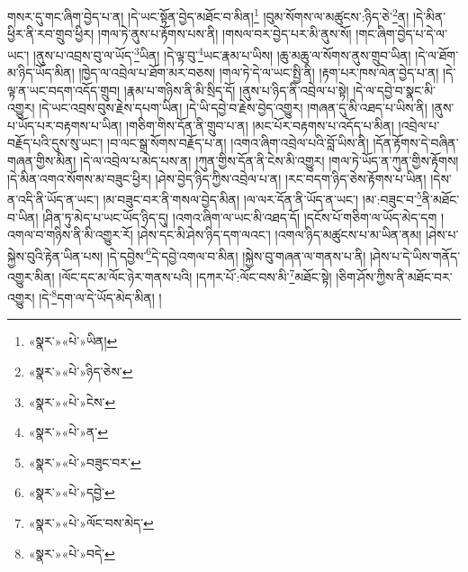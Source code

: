 གསར་དུ་གང་ཞིག་བྱེད་པ་ན། །དེ་ཡང་སྟོན་བྱེད་མཐོང་བ་མིན།\footnote{«སྣར་»«པེ་»ཡིན།} །བུམ་སོགས་ལ་མཚུངས་:ཉིད་ཅེ་\footnote{«སྣར་»«པེ་»ཉིད་ཅེས་}ན། །དེ་མིན་ཕྱིར་ནི་རབ་གྲུབ་ཕྱིར། །གལ་ཏེ་ནུས་པ་རྟོགས་པས་ནི། །གསལ་བར་བྱེད་པར་མི་ནུས་སོ། །གང་ཞིག་བྱེད་པ་དེ་ལ་ཡང་། །ནུས་པ་འབྲས་བུ་ལ་ཡོད་\footnote{«སྣར་»«པེ་»ངེས་}ཡིན། །དེ་ལྟ་བུ་\footnote{«སྣར་»«པེ་»ན་}ཡང་རྣམ་པ་ཡིས། །ཆུ་མཆུ་ལ་སོགས་ནུས་གྲུབ་ཡིན། །དེ་ལ་ཐོག་མ་ཉིད་ཡོད་མིན། །ཁྱེད་ལ་འབྲེལ་པ་ཐོག་མར་བཅས། །གལ་ཏེ་དེ་ལ་ཡང་སྤྱི་ནི། །རྟག་པར་ཁས་ལེན་བྱེད་པ་ན། །དེ་ལྟ་ན་ཡང་བདག་འདོད་གྲུབ། །རྣམ་པ་གཉིས་ནི་མི་སྲིད་དོ། །ནུས་པ་ཉིད་ནི་འབྲེལ་པ་སྟེ། །དེ་ལ་དབྱེ་བ་སྣང་མི་འགྱུར། །དེ་ཡང་འབྲས་བུས་རྗེས་དཔག་ཡིན། །དེ་ཡི་དབྱེ་བ་རྗེས་བྱེད་འགྱུར། །གཞན་དུ་མི་འཐད་པ་ཡིས་ནི། །ནུས་པ་ཡོད་པར་བརྟགས་པ་ཡིན། །གཅིག་གིས་དོན་ནི་གྲུབ་པ་ན། །མང་པོར་བརྟགས་པ་འདོད་པ་མིན། །འབྲེལ་པ་བརྗོད་པའི་དུས་སུ་ཡང་། །བ་ལང་སྒྲ་སོགས་བརྗོད་པ་ན། །འགའ་ཞིག་འབྲེལ་པའི་བློ་ཡིས་ནི། །དོན་རྟོགས་དེ་བཞིན་གཞན་གྱིས་མིན། །དེ་ལ་འབྲེལ་པ་མེད་པས་ན། །ཀུན་གྱིས་དོན་ནི་ངེས་མི་འགྱུར། །གལ་ཏེ་ཡོད་ན་ཀུན་གྱིས་རྟོགས། །དེ་མིན་འགའ་སོགས་མ་བཟུང་ཕྱིར། །ཤེས་བྱེད་ཉིད་ཀྱིས་འབྲེལ་པ་ན། །རང་བདག་ཉིད་ཅེས་རྟོགས་པ་ཡིན། །དེས་ན་འདི་ནི་ཡོད་ན་ཡང་། །མ་བཟུང་བར་ནི་གསལ་བྱེད་མིན། །ལ་ལར་དོན་ནི་ཡོད་ན་ཡང་། །མ་:བཟུང་བ་\footnote{«སྣར་»«པེ་»བཟུང་བར་}ནི་མཐོང་བ་ཡིན། །ཤིན་ཏུ་མེད་པ་ཡང་ཡོད་ཉིད་དུ། །འགའ་ཞིག་ལ་ཡང་མི་འཐད་དོ། །དངོས་པོ་གཅིག་ལ་ཡོད་མེད་དག །འགལ་བ་གཉིས་ནི་མི་འགྱུར་རོ། །ཤེས་དང་མི་ཤེས་ཉིད་དག་ལའང་། །འགལ་ཉིད་མཚུངས་པ་མ་ཡིན་ནམ། །ཤེས་པ་སྐྱེས་བུའི་རྟེན་ཡིན་པས། །དེ་དབྱེས་\footnote{«སྣར་»«པེ་»དབྱེ་}དེ་དབྱེ་འགལ་བ་མིན། །སྐྱེས་བུ་གཞན་ལ་གནས་པ་ནི། །ཤེས་པ་དེ་ཡིས་གནོད་འགྱུར་མིན། །ལོང་དང་མ་ལོང་ཉེར་གནས་པའི། །དཀར་པོ་:ལོང་བས་མི་\footnote{«སྣར་»«པེ་»ལོང་བས་མེད་}མཐོང་སྟེ། །ཅིག་ཤོས་ཀྱིས་ནི་མཐོང་བར་འགྱུར། །དེ་\footnote{«སྣར་»«པེ་»བདེ་}དག་ལ་དེ་ཡོད་མེད་མིན། །
